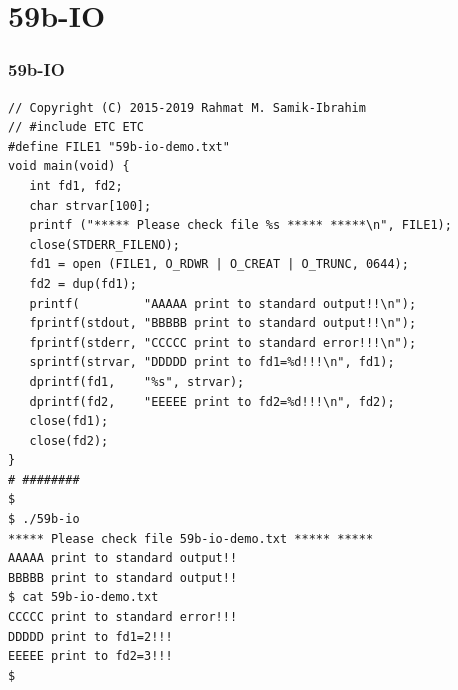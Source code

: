 \documentclass[aspectratio=169, xcolor=table, notheorems, hyperref={pdfpagelabels=false}]{beamer}
\begin{document}
\section{59b-IO}
\begin{frame}[fragile]
\frametitle{59b-IO}
\begin{lstlisting}[basicstyle=\ttfamily\tiny]
// Copyright (C) 2015-2019 Rahmat M. Samik-Ibrahim
// #include ETC ETC
#define FILE1 "59b-io-demo.txt"
void main(void) {
   int fd1, fd2;
   char strvar[100];
   printf ("***** Please check file %s ***** *****\n", FILE1);
   close(STDERR_FILENO);
   fd1 = open (FILE1, O_RDWR | O_CREAT | O_TRUNC, 0644);
   fd2 = dup(fd1);
   printf(         "AAAAA print to standard output!!\n"); 
   fprintf(stdout, "BBBBB print to standard output!!\n"); 
   fprintf(stderr, "CCCCC print to standard error!!!\n");
   sprintf(strvar, "DDDDD print to fd1=%d!!!\n", fd1);
   dprintf(fd1,    "%s", strvar);
   dprintf(fd2,    "EEEEE print to fd2=%d!!!\n", fd2);
   close(fd1);
   close(fd2);
}
# ########
$ 
$ ./59b-io 
***** Please check file 59b-io-demo.txt ***** *****
AAAAA print to standard output!!
BBBBB print to standard output!!
$ cat 59b-io-demo.txt 
CCCCC print to standard error!!!
DDDDD print to fd1=2!!!
EEEEE print to fd2=3!!!
$ 

\end{lstlisting}
\end{frame}

\end{document}

